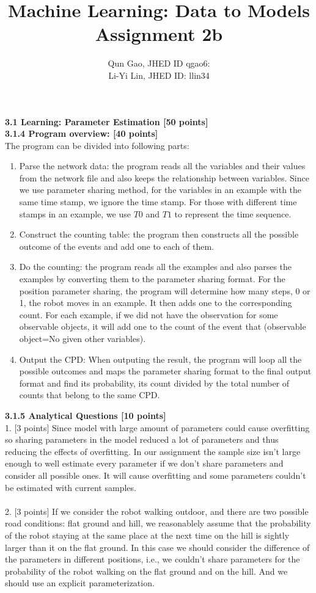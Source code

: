\documentclass[letterpaper, 11pt]{article}
\title{Machine Learning: Data to Models \\Assignment 2b}
\author{Qun Gao, JHED ID qgao6: \\Li-Yi Lin, JHED ID: llin34}
\date{}
\begin{document}
\maketitle
\noindent \Large \textbf{3.1 Learning: Parameter Estimation [50 points]}\\
\large \textbf{3.1.4 Program overview: [40 points]}\\
The program can be divided into following parts:
\begin{enumerate}
\item Parse the network data: the program reads all the variables and their values from the network file and also keeps the relationship between variables. Since we use parameter sharing method, for the variables in an example with the same time stamp, we ignore the time stamp. For those with different time stamps in an example, we use $T0$ and $T1$ to represent the time sequence.
\item Construct the counting table: the program then constructs all the possible outcome of the events and add one to each of them.
\item Do the counting: the program reads all the examples and also parses the examples by converting them to the parameter sharing format. For the position parameter sharing, the program will determine how many steps, 0 or 1, the robot moves in an example. It then adds one to the corresponding count. For each example, if we did not have the observation for some observable objects, it will add one to the count of the event that (observable object=No given other variables).
\item Output the CPD: When outputing the result, the program will loop all the possible outcomes and maps the parameter sharing format to the final output format and find its probability, its count divided by the total number of counts that belong to the same CPD.
\end{enumerate}
\large \textbf{3.1.5 Analytical Questions [10 points]}\\
1. [3 points] 
Since model with large amount of parameters could cause overfitting so sharing parameters in the model reduced a lot of parameters and thus reducing the effects of overfitting. In our assignment the sample size isn't large enough to well estimate every parameter if we don't share parameters and consider all possible ones. It will cause overfitting and some parameters couldn't be estimated with current samples.\\
\\
2. [3 points]
If we consider the robot walking outdoor, and there are two possible road conditions: flat ground and hill, we reasonablely assume that the probability of  the robot staying at the same place at the next time on the hill is sightly larger than it on the flat ground. In this case we should consider the difference of the parameters in different positions, i.e., we couldn't share parameters for the probability of the robot walking on the flat ground and on the hill. And we should use an explicit parameterization.\\
\end{document}
